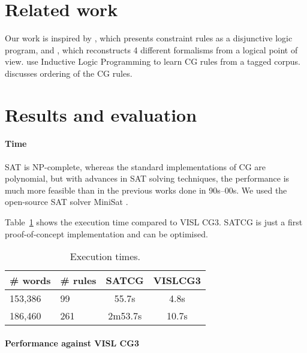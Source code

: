 \documentclass[11pt]{article}
\begin{document}
\section{Related work}
\label{sect:related}

Our work is inspired by \cite{lager98}, which presents constraint rules as a disjunctive logic program,
and \cite{lager_nivre01}, which reconstructs 4 different formalisms from a logical point of view.
\cite{lindberg_eineborg98ilp,asfrent14} use Inductive Logic Programming to learn CG rules from a tagged corpus.
\cite{lager01transformation} discusses ordering of the CG rules.


\section{Results and evaluation}

\paragraph{Time}

SAT is NP-complete, whereas the standard implementations of CG are polynomial, 
but with advances in SAT solving techniques, 
the performance is much more feasible than in the previous works done in 90s--00s.
We used the open-source SAT solver MiniSat \cite{een04sat}.

Table~\ref{table:time} shows the execution time compared to VISL CG3.
SATCG is just a first proof-of-concept implementation and can be optimised.

\begin{table}
  \centering
  \begin{tabular}{|l|l|c|c|}
     \hline
   \textbf{\# words} & \textbf{\# rules} &  \textbf{SATCG} & \textbf{VISLCG3} \\ \hline
              153,386    & 99    & 55.7s     & 4.8s \\  %
                186,460  & 261  &  2m53.7s & 10.7s \\\hline
  \end{tabular}
  \caption{Execution times.}
  \label{table:time}
\end{table}

\paragraph{Performance against VISL CG3}
\end{document}
